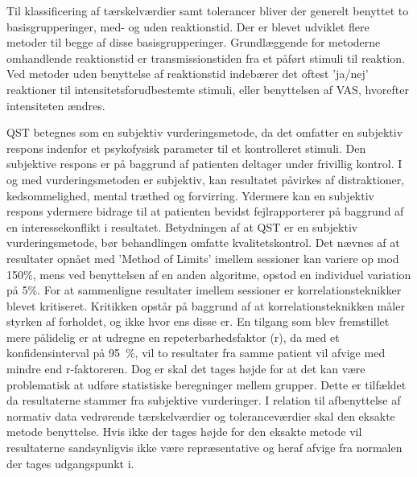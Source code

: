 Til klassificering af tærskelværdier samt tolerancer bliver der generelt benyttet to basisgrupperinger, med- og uden reaktionstid. Der er blevet udviklet flere metoder til begge af disse basisgrupperinger. Grundlæggende for metoderne omhandlende reaktionstid er transmissionstiden fra et påført stimuli til reaktion. Ved metoder uden benyttelse af reaktionstid indebærer det oftest 'ja/nej' reaktioner til intensitetsforudbestemte stimuli, eller benyttelsen af VAS, hvorefter intensiteten ændres. \citep{Yarnitsky1997} \citep{Yarnitsky2006} 

QST betegnes som en subjektiv vurderingsmetode, da det omfatter en subjektiv respons indenfor et psykofysisk parameter til et kontrolleret stimuli. Den subjektive respons er på baggrund af patienten deltager under frivillig kontrol. \citep{Mucke2016} I og med vurderingsmetoden er subjektiv, kan resultatet påvirkes af distraktioner, kedsommelighed, mental træthed og forvirring. Ydermere kan en subjektiv respons ydermere bidrage til at patienten bevidst fejlrapporterer på baggrund af en interessekonflikt i resultatet. \citep{Yarnitsky2006} Betydningen af at QST er en subjektiv vurderingsmetode, bør behandlingen omfatte kvalitetskontrol. Det nævnes af  at resultater opnået med 'Method of Limits' imellem sessioner kan variere op mod 150\%, mens ved benyttelsen af en anden algoritme, opstod en individuel variation på 5\%. For at sammenligne resultater imellem sessioner er korrelationsteknikker blevet kritiseret. Kritikken opstår på baggrund af at korrelationsteknikken måler styrken af forholdet, og ikke hvor ens disse er. En tilgang som blev fremstillet mere pålidelig er at udregne en repeterbarhedsfaktor (r), da med et konfidensinterval på 95~\%, vil to resultater fra samme patient vil afvige med mindre end r-faktoreren. Dog er skal det tages højde for at det kan være problematisk at udføre statistiske beregninger mellem grupper. Dette er tilfældet da resultaterne stammer fra subjektive vurderinger. \citep{Zaslansky1998} I relation til afbenyttelse af normativ data vedrørende tærskelværdier og toleranceværdier skal den eksakte metode benyttelse. Hvis ikke der tages højde for den eksakte metode vil resultaterne sandsynligvis ikke være repræsentative og heraf afvige fra normalen der tages udgangspunkt i. \citep{Yarnitsky1997}

